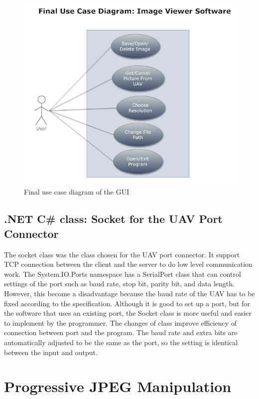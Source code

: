 \begin{figure}[!hbtp]
\begin{center}
\includegraphics[scale=0.7]{FinaluserCase.PNG} 
\end{center}
\caption{Final use case diagram of the GUI\label{GUI_finalUseCase}}
\end{figure}

\subsection{.NET C\# class: Socket for the UAV Port Connector}
The socket class was the class chosen for the UAV port connector. It support TCP connection between the client and the server to do low level communication work\cite{xiaX}. The System.IO.Ports namespace has a SerialPort class that can control settings of the port such as baud rate, stop bit, parity bit, and data length. However, this become a disadvantage because the baud rate of the UAV has to be fixed according to the specification. Although it is good to set up a port, but for the software that uses an existing port, the Socket class is more useful and easier to implement by the programmer. The changes of class improve efficiency of connection between port and the program. The baud rate and extra bits are automatically adjusted to be the same as the port, so the setting is identical between the input and output. 

\section{Progressive JPEG Manipulation}

